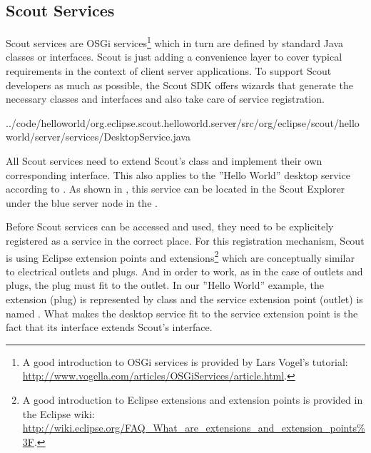 \documentclass[a4paper,10pt,twoside]{book}
\begin{document}
\subsection{Scout Services}

Scout services are OSGi services\footnote{
A good introduction to OSGi services is provided by Lars Vogel's tutorial: \url{http://www.vogella.com/articles/OSGiServices/article.html}.
}
which in turn are defined by standard Java classes or interfaces.
Scout is just adding a convenience layer to cover typical requirements in the context of client server applications. 
To support Scout developers as much as possible, the Scout SDK offers wizards that generate the necessary classes and interfaces and also take care of service registration.


{../code/helloworld/org.eclipse.scout.helloworld.server/src/org/eclipse/scout/helloworld/server/services/DesktopService.java}

All Scout services need to extend Scout's  class and implement their own corresponding interface.
This also applies to the ''Hello World'' desktop service according to .
As shown in , this service can be located in the Scout Explorer under the blue server node in the .

Before Scout services can be accessed and used, they need to be explicitely registered as a service in the correct place.
For this registration mechanism, Scout is using Eclipse extension points and extensions\footnote{
A good introduction to Eclipse extensions and extension points is provided in the Eclipse wiki: \url{http://wiki.eclipse.org/FAQ_What_are_extensions_and_extension_points\%3F}.
}
which are conceptually similar to electrical outlets and plugs.
And in order to work, as in the case of outlets and plugs, the plug must fit to the outlet.
In our ''Hello World'' example, the extension (plug) is represented by class  and the service extension point (outlet) is named .
What makes the desktop service fit to the service extension point is the fact that its interface  extends Scout's  interface.
\end{document}
